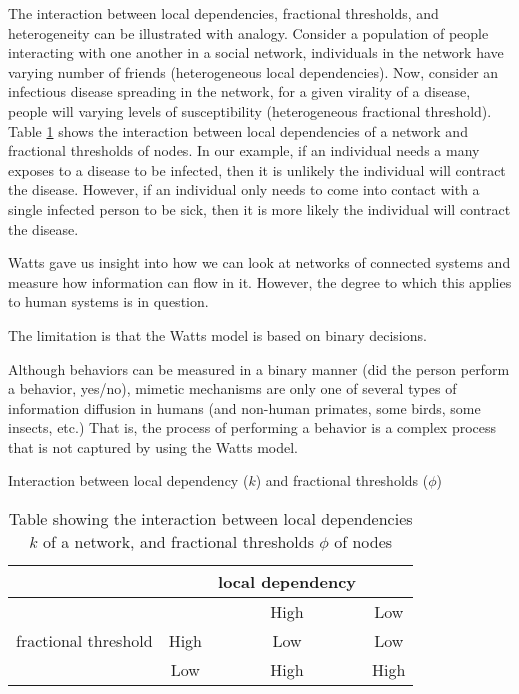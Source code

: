 \documentclass[10pt,letterpaper]{article}
\begin{document}
The interaction between local dependencies, fractional thresholds, and heterogeneity
can be illustrated with analogy.
Consider a population of people interacting with one another in a social network,
individuals in the network have varying number of friends (heterogeneous local dependencies).
Now, consider an infectious disease spreading in the network,
for a given virality of a disease, people will varying levels of susceptibility (heterogeneous fractional threshold).
Table \ref{table:k_vs_phi} shows the interaction between local dependencies of a network and
fractional thresholds of nodes.
In our example, if an individual needs a many exposes to a disease to be infected,
then it is unlikely the individual will contract the disease.
However, if an individual only needs to come into contact with a single infected person to be sick,
then it is more likely the individual will contract the disease.

Watts gave us insight into how we can look at networks of connected systems and
measure how information can flow in it.
However, the degree to which this applies to human systems is in question.


The limitation is that the Watts model is based on binary decisions.

Although behaviors can be measured in a binary manner (did the person perform a behavior, yes/no), mimetic mechanisms are only one of several types of information diffusion in humans (and non-human primates, some birds, some insects, etc.) 
That is, the process of performing a behavior is a complex process
that is not captured by using the Watts model.

\begin{table}[h]
\caption{Interaction between local dependency ($k$) and fractional thresholds ($\phi$)} 
\label{table:k_vs_phi} 
\begin{center}
\begin{tabular}{c|c|c|c|}
    & & local dependency & \\
    \hline 
    & & High & Low \\ 
    \hline 
    fractional threshold & High & Low & Low \\ 
    \hline 
    & Low & High & High \\ 
    \hline 
\end{tabular} 
\caption*{Table showing the interaction between local dependencies $k$ of a network,
          and fractional thresholds $\phi$ of nodes}
\end{center}
\end{table}
\end{document}
